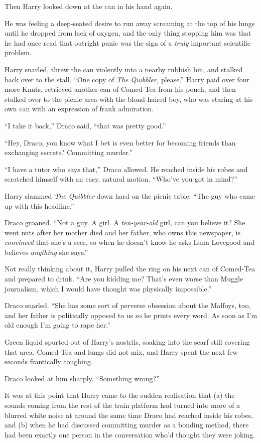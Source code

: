 Then Harry looked down at the can in his hand again.

He was feeling a deep-seated desire to run away screaming at the top of
his lungs until he dropped from lack of oxygen, and the only thing
stopping him was that he had once read that outright panic was the sign
of a \emph{truly} important scientific problem.

Harry snarled, threw the can violently into a nearby rubbish bin, and
stalked back over to the stall. ``One copy of \emph{The Quibbler,}
please.'' Harry paid over four more Knuts, retrieved another can of
Comed-Tea from his pouch, and then stalked over to the picnic area with
the blond-haired boy, who was staring at his own can with an expression
of frank admiration.

``I take it back,'' Draco said, ``that was pretty good.''

``Hey, Draco, you know what I bet is even better for becoming friends
than exchanging secrets? Committing murder.''

``I have a tutor who says that,'' Draco allowed. He reached inside his
robes and scratched himself with an easy, natural motion. ``Who've you
got in mind?''

Harry slammed \emph{The Quibbler} down hard on the picnic table. ``The
guy who came up with this headline.''

Draco groaned. ``Not a guy. A girl. A \emph{ten-year-old} girl, can you
believe it? She went nuts after her mother died and her father, who owns
this newspaper, is \emph{convinced} that she's a seer, so when he
doesn't know he asks Luna Lovegood and believes \emph{anything} she
says.''

Not really thinking about it, Harry pulled the ring on his next can of
Comed-Tea and prepared to drink. ``Are you kidding me? That's even worse
than Muggle journalism, which I would have thought was physically
impossible.''

Draco snarled. ``She has some sort of perverse obsession about the
Malfoys, too, and her father is politically opposed to us so he prints
every word. As soon as I'm old enough I'm going to rape her.''

Green liquid spurted out of Harry's nostrils, soaking into the scarf
still covering that area. Comed-Tea and lungs did not mix, and Harry
spent the next few seconds frantically coughing.

Draco looked at him sharply. ``Something wrong?''

It was at this point that Harry came to the sudden realisation that (a)
the sounds coming from the rest of the train platform had turned into
more of a blurred white noise at around the same time Draco had reached
inside his robes, and (b) when he had discussed committing murder as a
bonding method, there had been exactly one person in the conversation
who'd thought they were joking.

